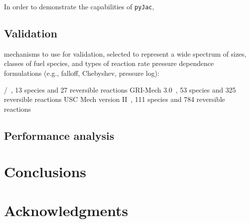 \documentclass[preprint,12pt]{elsarticle}
\begin{document}
{In order to demonstrate the capabilities of \texttt{pyJac}, 

\subsection{Validation}
\label{s:validation}

mechanisms to use for validation, selected to represent a wide spectrum of sizes, classes of fuel species, and types of reaction rate pressure dependence formulations (e.g., falloff, Chebyshev, pressure log):

\slash {}~\cite{Burke:2011fh}, 13 species and 27 reversible reactions
GRI-Mech 3.0~\cite{smith_gri-mech_30}, 53 species and 325 reversible reactions
USC Mech version II~\cite{Wang:2007}, 111 species and 784 reversible reactions

\subsection{Performance analysis}
\label{s:performance}






\section{Conclusions}



\section*{Acknowledgments}


}
\end{document}
